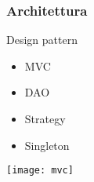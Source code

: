 \begin{frame}
\frametitle{Architettura}
\begin{minipage}[c]{.38\textwidth}
Design pattern
\begin{itemize}
\item MVC
\item DAO
\item Strategy
\item Singleton
\end{itemize}
\end{minipage}
\begin{minipage}[c]{.60\textwidth}
\centering 
\texttt{[image: mvc]}
\end{minipage}
\end{frame}